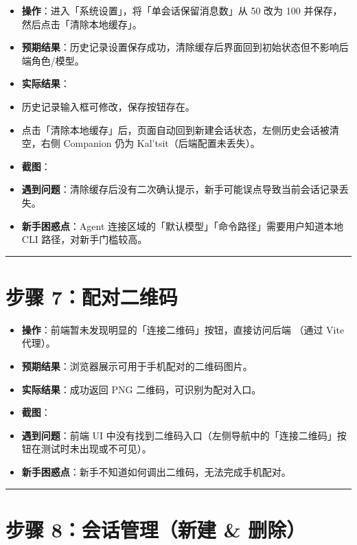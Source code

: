 \documentclass[12pt,a4paper]{ctexart}
\begin{document}
\begin{itemize}[leftmargin=2em]
\item \textbf{操作}：进入「系统设置」，将「单会话保留消息数」从 50 改为 100 并保存，然后点击「清除本地缓存」。
\item \textbf{预期结果}：历史记录设置保存成功，清除缓存后界面回到初始状态但不影响后端角色/模型。
\item \textbf{实际结果}：
\item 历史记录输入框可修改，保存按钮存在。
\item 点击「清除本地缓存」后，页面自动回到新建会话状态，左侧历史会话被清空，右侧 Companion 仍为 Kal'tsit（后端配置未丢失）。
\item \textbf{截图}：
\item \textbf{遇到问题}：清除缓存后没有二次确认提示，新手可能误点导致当前会话记录丢失。
\item \textbf{新手困惑点}：Agent 连接区域的「默认模型」「命令路径」需要用户知道本地 CLI 路径，对新手门槛较高。
\end{itemize}

\hrule


\section{步骤 7：配对二维码}

\begin{itemize}[leftmargin=2em]
\item \textbf{操作}：前端暂未发现明显的「连接二维码」按钮，直接访问后端 （通过 Vite 代理）。
\item \textbf{预期结果}：浏览器展示可用于手机配对的二维码图片。
\item \textbf{实际结果}：成功返回 PNG 二维码，可识别为配对入口。
\item \textbf{截图}：
\item \textbf{遇到问题}：前端 UI 中没有找到二维码入口（左侧导航中的「连接二维码」按钮在测试时未出现或不可见）。
\item \textbf{新手困惑点}：新手不知道如何调出二维码，无法完成手机配对。
\end{itemize}

\hrule


\section{步骤 8：会话管理（新建 \& 删除）}
\end{document}
